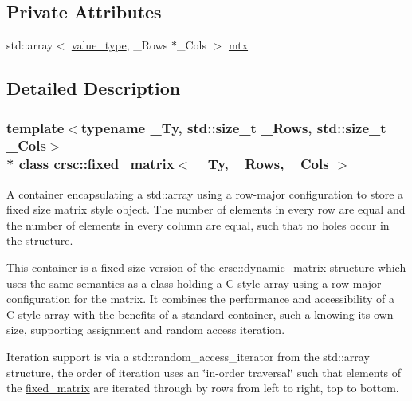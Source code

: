 \subsection*{Private Attributes}
\begin{DoxyCompactItemize}
\item 
std\+::array$<$ \hyperlink{classcrsc_1_1fixed__matrix_a1d0717197dc43f3752d508763a8b5a9e}{value\+\_\+type}, \+\_\+\+Rows $\ast$\+\_\+\+Cols $>$ \hyperlink{classcrsc_1_1fixed__matrix_a2d3a7929f00a812a3241729ab477ea54}{mtx}
\end{DoxyCompactItemize}


\subsection{Detailed Description}
\subsubsection*{template$<$typename \+\_\+\+Ty, std\+::size\+\_\+t \+\_\+\+Rows, std\+::size\+\_\+t \+\_\+\+Cols$>$\\*
class crsc\+::fixed\+\_\+matrix$<$ \+\_\+\+Ty, \+\_\+\+Rows, \+\_\+\+Cols $>$}

A container encapsulating a {\ttfamily std\+::array} using a row-\/major configuration to store a fixed size matrix style object. The number of elements in every row are equal and the number of elements in every column are equal, such that no holes occur in the structure. 

This container is a fixed-\/size version of the {\ttfamily \hyperlink{classcrsc_1_1dynamic__matrix}{crsc\+::dynamic\+\_\+matrix}} structure which uses the same semantics as a class holding a C-\/style array using a row-\/major configuration for the matrix. It combines the performance and accessibility of a C-\/style array with the benefits of a standard container, such a knowing its own size, supporting assignment and random access iteration.

Iteration support is via a {\ttfamily std\+::random\+\_\+access\+\_\+iterator} from the {\ttfamily std\+::array} structure, the order of iteration uses an \char`\"{}in-\/order traversal\char`\"{} such that elements of the {\ttfamily \hyperlink{classcrsc_1_1fixed__matrix}{fixed\+\_\+matrix}} are iterated through by rows from left to right, top to bottom.


